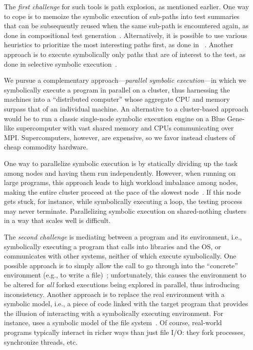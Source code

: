 The {\em first challenge} for such tools is path explosion, as mentioned earlier.  One way to cope is to memoize the symbolic execution of sub-paths into test summaries that can be subsequently reused when the same sub-path is encountered again, as done in compositional test generation~\cite{godefroid:compdyntest}.  Alternatively, it is possible to use various heuristics to prioritize the most interesting paths first, as done in \klee~\cite{klee}.  Another approach is to execute symbolically only paths that are of interest to the test, as done in selective symbolic execution~\cite{s2e}.

We pursue a complementary approach---{\em parallel symbolic execution}---in which we symbolically execute a program in parallel on a cluster, thus harnessing the machines into a ``distributed computer'' whose aggregate CPU and memory surpass that of an individual machine.  An alternative to a cluster-based approach would be to run a classic single-node symbolic execution engine on a Blue Gene-like supercomputer with vast shared memory and CPUs communicating over MPI.  Supercomputers, however, are expensive, so we favor instead clusters of cheap commodity hardware.  

One way to parallelize symbolic execution is by statically dividing up the task among nodes and having them run independently.   However, when running on large programs, this approach leads to high workload imbalance among nodes, making the entire cluster proceed at the pace of the slowest node~\cite{parallelSymbex}.  If this node gets stuck, for instance, while symbolically executing a loop, the testing process may never terminate.  Parallelizing symbolic execution on shared-nothing clusters in a way that scales well is difficult.

The {\em second challenge} is mediating between a program and its environment, i.e., symbolically executing a program that calls into libraries and the OS, or communicates with other systems, neither of which execute symbolically.  One possible approach is to simply allow the call to go through into the ``concrete'' environment (e.g., to write a file)~\cite{dart,exe}; unfortunately, this causes the environment to be altered for \emph{all} forked executions being explored in parallel, thus introducing inconsistency.  Another approach is to replace the real environment with a symbolic model, i.e., a piece of code linked with the target program that provides the illusion of interacting with a symbolically executing environment.  For instance, \klee uses a symbolic model of the file system~\cite{klee}. Of course, real-world programs typically interact in richer ways than just file I/O: they fork processes, synchronize threads, etc.  

